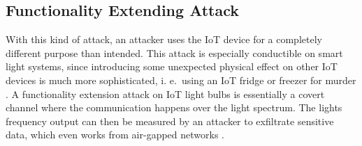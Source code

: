 \subsection{Functionality Extending Attack}
\label{sec:extending_func}

With this kind of attack, an attacker uses the IoT device for a completely different purpose than intended. %
This attack is especially conductible on smart light systems, since introducing some unexpected physical effect on other IoT devices is much more sophisticated, i. e.\ using an IoT fridge or freezer for murder \cite{Bhartiya::YSFMK}. 
A functionality extension attack on IoT light bulbs is essentially a covert channel where the communication happens over the light spectrum. The lights frequency output can then be measured by an attacker to exfiltrate sensitive data, which even works from air-gapped networks \cite{Ronen:2016:EFAIDCSL}.
